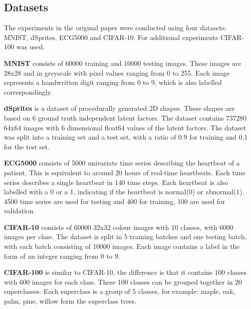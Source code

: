 
\subsection{Datasets} 

The experiments in the original paper were conducted using four datasets: MNIST, dSprites, ECG5000 and CIFAR-10. For additional experiments CIFAR-100 was used. 

\textbf{MNIST}\cite{lecun1998gradient} consists of 60000 training and 10000 testing images. These images are 28x28 and in greyscale with pixel values ranging from 0 to 255. Each image represents a handwritten digit ranging from 0 to 9, which is also labelled correspondingly. 

\textbf{dSprites}\cite{dsprites17} is a dataset of procedurally generated 2D shapes. These shapes are based on 6 ground truth independent latent factors. The dataset contains 737280 64x64 images with 6 dimensional float64 values of the latent factors. The dataset was split into a training set and a test set, with a ratio of 0.9 for training and 0.1 for the test set.

\textbf{ECG5000}\cite{goldberger2000physiobank} consists of 5000 univariate time series describing the heartbeat of a patient. This is equivalent to around 20 hours of real-time heartbeats. Each time series describes a single heartbeat in 140 time steps. Each heartbeat is also labelled with a 0 or a 1, indicating if the heartbeat is normal(0) or abnormal(1). 4500 time series are used for testing and 400 for training, 100 are used for validation. 

\textbf{CIFAR-10}\cite{krizhevsky2009learning} consists of 60000 32x32 colour images with 10 classes, with 6000 images per class. The dataset is split in 5 training batches and one testing batch, with each batch consisting of 10000 images. Each image contains a label in the form of an integer ranging from 0 to 9.

\textbf{CIFAR-100}\cite{krizhevsky2009learning} is similar to CIFAR-10, the difference is that it contains 100 classes with 600 images for each class. These 100 classes can be grouped together in 20 superclasses. Each superclass is a group of 5 classes, for example: maple, oak, palm, pine, willow form the superclass trees.


